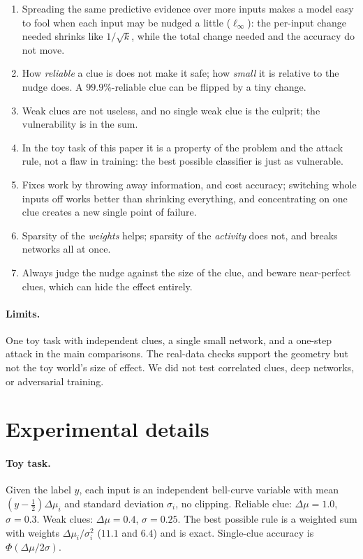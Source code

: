 \documentclass[11pt]{article}
\begin{document}
\begin{enumerate}
\item Spreading the same predictive evidence over more inputs makes a model easy to fool when each input may be nudged a little ($\ell_\infty$): the per-input change needed shrinks like $1/\sqrt k$, while the total change needed and the accuracy do not move.
\item How \emph{reliable} a clue is does not make it safe; how \emph{small} it is relative to the nudge does. A $99.9\%$-reliable clue can be flipped by a tiny change.
\item Weak clues are not useless, and no single weak clue is the culprit; the vulnerability is in the sum.
\item In the toy task of this paper it is a property of the problem and the attack rule, not a flaw in training: the best possible classifier is just as vulnerable.
\item Fixes work by throwing away information, and cost accuracy; switching whole inputs off works better than shrinking everything, and concentrating on one clue creates a new single point of failure.
\item Sparsity of the \emph{weights} helps; sparsity of the \emph{activity} does not, and breaks networks all at once.
\item Always judge the nudge against the size of the clue, and beware near-perfect clues, which can hide the effect entirely.
\end{enumerate}

\paragraph{Limits.} One toy task with independent clues, a single small network, and a one-step attack in the main comparisons. The real-data checks
support the geometry but not the toy world's size of effect. We did not test correlated clues, deep networks, or adversarial training.

\appendix

\section{Experimental details}
\label{app:details}

\paragraph{Toy task.} Given the label $y$, each input is an independent bell-curve variable with mean $(y-\tfrac12)\Delta\mu_i$ and standard deviation $\sigma_i$, no clipping. Reliable clue: $\Delta\mu=1.0$, $\sigma=0.3$.
Weak clues: $\Delta\mu=0.4$, $\sigma=0.25$. The best possible rule is a weighted sum with weights $\Delta\mu_i/\sigma_i^2$ ($11.1$ and $6.4$) and is exact. Single-clue accuracy is $\Phi(\Delta\mu/2\sigma)$.
\end{document}
